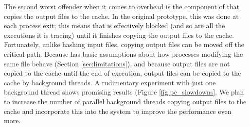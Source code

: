 The second worst offender when it comes to overhead is the component of \pc that copies the output files to the cache. In the original \pc prototype, this was done at each process exit; this means that \pc is effectively blocked (and so are all the executions it is tracing) until it finishes copying the output files to the cache. Fortunately, unlike hashing input files, copying output files can be moved off the critical path. Because \pc has basic assumptions about how processes modifying the same file behave (Section \ref{sec:limitations}), and because output files are not copied to the cache until the end of execution, output files can be copied to the cache by background threads. A rudimentary experiment with just one background thread shows promising results (Figure \ref{fig:pc_slowdowns}. We plan to increase the number of parallel background threads copying output files to the cache and incorporate this into the system to improve the performance even more.

